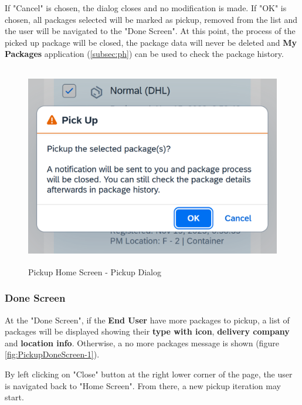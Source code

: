 If "Cancel" is chosen, the dialog closes and no modification is made. If "OK" is chosen, all packages selected will be marked as pickup, removed from the list and the user will be navigated to the "Done Screen". At this point, the process of the picked up package will be closed, the package data will never be deleted and \textbf{My Packages} application (\autoref{subsec:ph}) can be used to check the package history.

\bigskip
\begin{figure}[H]
	\centering
	\includegraphics[height=250pt]{images/user_doc/pickup/PickupDialog.png}
	\caption{Pickup Home Screen - Pickup Dialog}
	\label{fig:PickupDialog}
\end{figure}


\subsubsection{Done Screen}

At the "Done Screen", if the \textbf{End User} have more packages to pickup, a list of packages will be displayed showing their \textbf{type with icon}, \textbf{delivery company} and \textbf{location info}. Otherwise, a no more packages message is shown (figure \ref{fig:PickupDoneScreen-1}). 

By left clicking on "Close" button at the right lower corner of the page, the user is navigated back to "Home Screen".
From there, a new pickup iteration may start.

